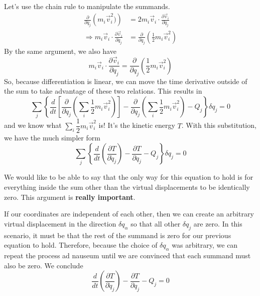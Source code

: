 \documentclass{article}
\begin{document}
Let's use the chain rule to manipulate the summands. 
\begin{align}
  \frac{\partial}{\partial \dot{q}_j}\left(m_i \vec{v}_i^2) \right) &= 2m_i\vec{v}_i\cdot\frac{\partial \vec{v}_i}{\partial \dot{q}_j} \\
  \Rightarrow m_i\vec{v}_i\cdot\frac{\partial \vec{v}_i}{\partial\dot{q}_j} &= \frac{\partial}{\partial \dot{q}_j}\left( \frac{1}{2}m_i\vec{v}_i^2 \right)
\end{align}
By the same argument, we also have
\begin{equation}
  m_i\vec{v}_i \cdot\frac{\partial\vec{v}_i}{\partial q_j} = \frac{\partial}{\partial q_j}\left( \frac{1}{2}m_i\vec{v}_i^2 \right)
\end{equation}
So, because differentiation is linear, we can move the time derivative outside
of the sum to take advantage of these two relations. This results in
\begin{equation}
  \sum_j\left\{\frac{d}{dt}\left[ \frac{\partial}{\partial \dot{q}_j}\left( \sum_i \frac{1}{2}m_i\vec{v}_i^2  \right)\right] -\frac{\partial}{\partial q_j}\left(\sum_i\frac{1}{2}m_i\vec{v}_i^2  \right)-Q_j \right\} \delta q_j = 0
\end{equation}
and we know what $\sum_i\dfrac{1}{2}m_i\vec{v}_i^2$ is! It's the kinetic energy
$T$. With this substitution, we have the much simpler form
\begin{equation}
  \sum_j\left\{ \frac{d}{dt}\left( \frac{\partial T}{\partial\dot{q}_j} \right)-\frac{\partial T}{\partial q_j}-Q_j \right\}\delta q_j = 0 
\end{equation}

We would like to be able to say that the only way for this equation to hold is
for everything inside the sum other than the virtual displacements to be
identically zero. This argument is \textbf{really important}.

If our coordinates are independent of each other, then we can create an
arbitrary virtual displacement in the direction $\delta q_\alpha$ so that all
other $\delta q_j$ are zero. In this scenario, it must be that the rest of the
summand is zero for our previous equation to hold. Therefore, because the choice
of $\delta q_\alpha$ was arbitrary, we can repeat the process ad nauseum until
we are convinced that each summand must also be zero. We conclude
\begin{equation}
  \frac{d}{dt}\left( \frac{\partial T}{\partial \dot{q}_j} \right) - \frac{\partial T}{\partial q_j} - Q_j = 0
\end{equation}
\end{document}
